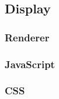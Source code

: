 \subsection{Display}		
		\subsubsection{Renderer}
		
		\subsubsection{JavaScript}
		\subsubsection{CSS}